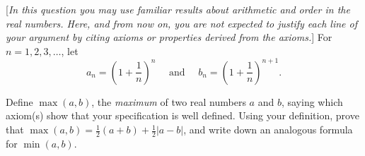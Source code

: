 \documentclass[answers]{exam}
\begin{document}
\begin{questions}



\question%



\question%
{}[\emph{In this question you may use familiar results about arithmetic and order in the real numbers. Here, and from now on, you are not expected to justify each line of your argument by citing axioms or properties derived from the axioms.}]
For $n=1,2,3, \ldots$, let \[
a_{n}=\left(1+\frac{1}{n}\right)^{n} \quad \text { and } \quad b_{n}=\left(1+\frac{1}{n}\right)^{n+1}.\]



\question%
Define $\max (a, b)$, the \emph{maximum} of two real numbers $a$ and $b$, saying which axiom(s) show that your specification is well defined. Using your definition, prove that $\max (a, b)=\frac{1}{2}(a+b)+\frac{1}{2}|a-b|$, and write down an analogous formula for $\min (a, b)$.

\end{questions}
\end{document}
